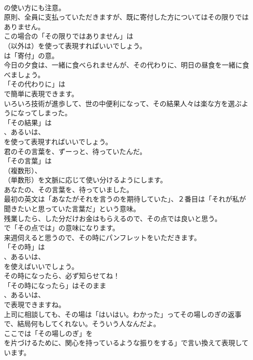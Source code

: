 \documentclass[8pt]{extreport}
\begin{document}
\begin{CJK}{UTF8}{min}
\\	の使い方にも注意。	
\\	原則、全員に支払っていただきますが、既に寄付した方についてはその限りではありません。 
\\	この場合の「その限りではありません」は 
\\	（以外は）を使って表現すればいいでしょう。
\\	は「寄付」の意。	
\\	今日の夕食は、一緒に食べられませんが、その代わりに、明日の昼食を一緒に食べましょう。 
\\	「その代わりに」は
\\	で簡単に表現できます。	
\\	いろいろ技術が進歩して、世の中便利になって、その結果人々は楽な方を選ぶようになってしまった。 
\\	「その結果」は
\\	、あるいは、
\\	を使って表現すればいいでしょう。	
\\	君のその言葉を、ずーっと、待っていたんだ。 
\\	「その言葉」は
\\	（複数形）、
\\	（単数形）を文脈に応じて使い分けるようにします。	
\\	あなたの、その言葉を、待っていました。 
\\	最初の英文は「あなたがそれを言うのを期待していた」、２番目は「それが私が聞きたいと思っていた言葉だ」という意味。	
\\	残業したら、した分だけお金はもらえるので、その点では良いと思う。 
\\	で「その点では」の意味になります。	
\\	来週伺えると思うので、その時にパンフレットをいただきます。 
\\	「その時」は
\\	、あるいは、
\\	を使えばいいでしょう。	
\\	その時になったら、必ず知らせてね！ 
\\	「その時になったら」はそのまま
\\	、あるいは、
\\	で表現できますね。	
\\	上司に相談しても、その場は「はいはい。わかった」ってその場しのぎの返事で、結局何もしてくれない。そういう人なんだよ。 
\\	ここでは「その場しのぎ」を
\\	を片づけるために、関心を持っているような振りをする」で言い換えて表現しています。	

\end{CJK}
\end{document}
